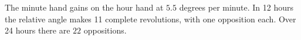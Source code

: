 The minute hand gains on the hour hand at $5.5$ degrees per minute. In 12 hours the relative angle makes 11 complete revolutions, with one opposition each. Over 24 hours there are $\boxed{22}$ oppositions.
